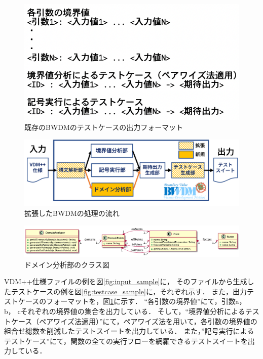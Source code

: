 \documentclass[uplatex, report, a4j, 10pt]{jsbook}
\begin{document}
\begin{figure}[t]
	\begin{center}
		\includegraphics[keepaspectratio, width=160mm]{figs/bwdm_format.png}
		\caption{既存のBWDMのテストケースの出力フォーマット}
		\label{fig:bwdm_format}
	\end{center}
\end{figure}

\begin{figure}[t]
	\begin{center}
		\includegraphics[keepaspectratio, width=160mm]{figs/bwdm_structure.png}
		\caption{拡張したBWDMの処理の流れ}
		\label{fig:bwdm_structure}
	\end{center}
\end{figure}
\begin{figure}[t]
	\begin{center}
		\includegraphics[keepaspectratio, width=160mm]{figs/DomainAnalyzer.png}
		\caption{ドメイン分析部のクラス図}
		\label{fig:class_DomainAnalyzer}
	\end{center}
\end{figure}

VDM++仕様ファイルの例を図\ref{fig:input_sample}に，
そのファイルから生成したテストケースの例を図\ref{fig:testcase_sample}に，それぞれ示す．
また，出力テストケースのフォーマットを，図\ref{fig:bwdm_format}に示す．
“各引数の境界値”にて，引数a， b， cそれぞれの境界値の集合を出力している．
そして，“境界値分析によるテストケース（ペアワイズ法適用）”にて，ペアワイズ法を用いて，各引数の境界値の組合せ総数を削減したテストスイートを出力している．
また，”記号実行によるテストケース”にて，関数の全ての実行フローを網羅できるテストスイートを出力している．
\end{document}
